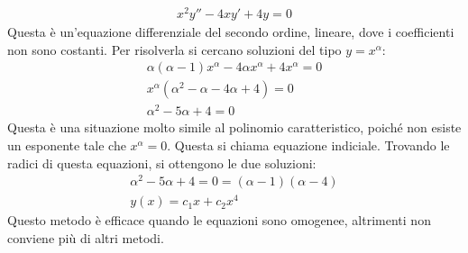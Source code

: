 \documentclass{article}
\numberwithin{equation}{subsection}
\begin{document}

\begin{gather*}
    x^2y''-4xy'+4y=0
\end{gather*}
Questa è un'equazione differenziale del secondo ordine, lineare, dove i coefficienti non sono costanti. 
Per risolverla si cercano soluzioni del tipo $y=x^\alpha$:
\begin{gather*}
    \alpha(\alpha-1)x^{\alpha}-4\alpha x^\alpha+4x^\alpha=0\\
    x^\alpha\left(\alpha^2-\alpha-4\alpha+4\right)=0\\
    \alpha^2-5\alpha+4=0
\end{gather*}
Questa è una situazione molto simile al polinomio caratteristico, poiché non esiste un esponente tale che $x^\alpha=0$. Questa si chiama equazione indiciale. Trovando le radici di questa equazioni, si ottengono le due soluzioni:
\begin{gather*}
    \alpha^2-5\alpha+4=0=(\alpha-1)(\alpha-4)\\
    y(x)=c_1x+c_2x^4
\end{gather*}
Questo metodo è efficace quando le equazioni sono omogenee, altrimenti non conviene più di altri metodi. 
\end{document}
